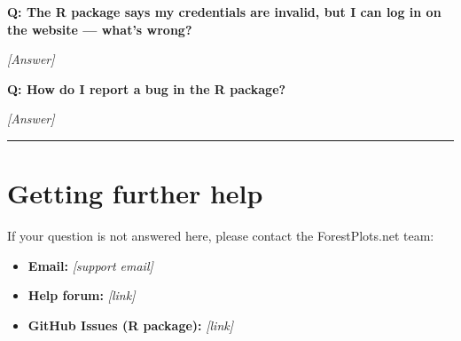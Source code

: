 \documentclass[
]{book}
\providecommand{\tightlist}{%
  \setlength{\itemsep}{0pt}\setlength{\parskip}{0pt}}
\begin{document}
\textbf{Q: The R package says my credentials are invalid, but I can log in on the website --- what's wrong?}

\emph{{[}Answer{]}}

\textbf{Q: How do I report a bug in the R package?}

\emph{{[}Answer{]}}

\begin{center}\rule{0.5\linewidth}{0.5pt}\end{center}

\section{Getting further help}\label{getting-further-help}

If your question is not answered here, please contact the ForestPlots.net team:

\begin{itemize}
\tightlist
\item
  \textbf{Email:} \emph{{[}support email{]}}
\item
  \textbf{Help forum:} \emph{{[}link{]}}
\item
  \textbf{GitHub Issues (R package):} \emph{{[}link{]}}
\end{itemize}


\end{document}
